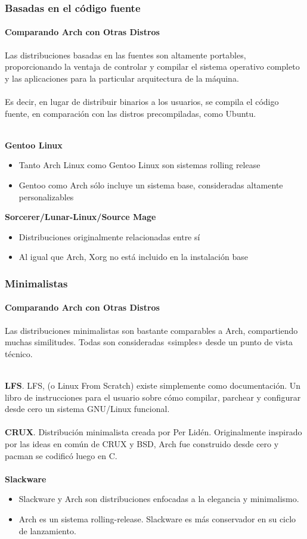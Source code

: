 \documentclass[9pt,t]{beamer}
\begin{document}
\begin{frame}\justifying
  \frametitle{Basadas en el código fuente}
  \framesubtitle{Comparando Arch con Otras Distros}
    Las distribuciones basadas en las fuentes son altamente portables, proporcionando la ventaja 
    de controlar y compilar el sistema operativo completo y las aplicaciones para la particular 
    arquitectura de la máquina.
    \ \\ \ \\
    Es decir, en lugar de distribuir binarios a los usuarios, se compila el código fuente, en 
    comparación con las distros precompiladas, como Ubuntu.
    \ \\ \ \\
    {\small
    {\bf Gentoo Linux}
    \begin{itemize}\justifying
      \item Tanto Arch Linux como Gentoo Linux son sistemas rolling release
      \item Gentoo como Arch sólo incluye un sistema base, consideradas altamente personalizables
    \end{itemize}
    {\bf Sorcerer/Lunar-Linux/Source Mage}
    \begin{itemize}\justifying
      \item Distribuciones originalmente relacionadas entre sí
      \item Al igual que Arch, Xorg no está incluido en la instalación base
    \end{itemize}
    }
\end{frame}

\begin{frame}\justifying
  \frametitle{Minimalistas}
  \framesubtitle{Comparando Arch con Otras Distros}
    Las distribuciones minimalistas son bastante comparables a Arch, compartiendo muchas similitudes. 
    Todas son consideradas «simples» desde un punto de vista técnico.
    \ \\ \ \\
    {\small
    {\bf LFS}. LFS, (o Linux From Scratch) existe simplemente como documentación. Un libro de instrucciones para 
    el usuario sobre cómo compilar, parchear y configurar desde cero un sistema GNU/Linux funcional.
    \ \\ \ \\
    {\bf CRUX}. Distribución minimalista creada por Per Lidén. Originalmente inspirado por las ideas en común de 
    CRUX y BSD, Arch fue construido desde cero y pacman se codificó luego en C.
    \ \\ \ \\
    {\bf Slackware}
    \begin{itemize}\justifying
      \item Slackware y Arch son distribuciones enfocadas a la elegancia y minimalismo. 
      \item Arch es un sistema rolling-release. Slackware es más conservador en su ciclo de lanzamiento.
    \end{itemize}
    }
\end{frame}
\end{document}
